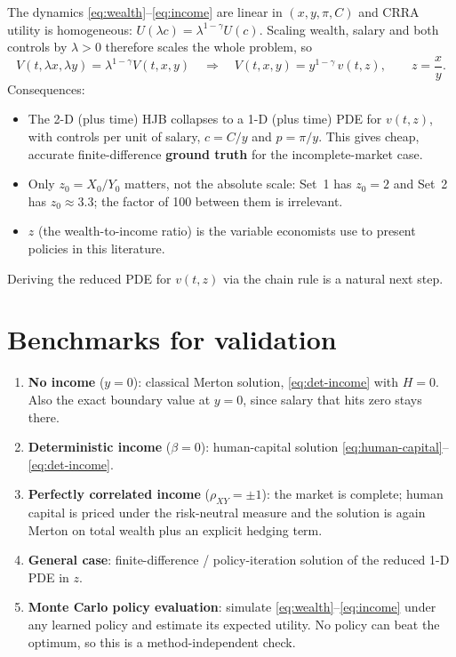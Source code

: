 \documentclass[11pt]{article}
\newcommand{\rxy}{\rho_{XY}}
\begin{document}
The dynamics \eqref{eq:wealth}--\eqref{eq:income} are linear in $(x,y,\pi,C)$ and
CRRA utility is homogeneous: $U(\lambda c)=\lambda^{1-\gamma}U(c)$. Scaling wealth,
salary and both controls by $\lambda>0$ therefore scales the whole problem, so
\[
V(t,\lambda x,\lambda y) = \lambda^{1-\gamma}V(t,x,y)
\quad\Longrightarrow\quad
\boxed{V(t,x,y) = y^{1-\gamma}\,v(t,z),\qquad z = \frac{x}{y}.}
\]
Consequences:
\begin{itemize}
  \item The 2-D (plus time) HJB collapses to a 1-D (plus time) PDE for $v(t,z)$, with
        controls per unit of salary, $c=C/y$ and $p=\pi/y$. This gives cheap,
        accurate finite-difference \textbf{ground truth} for the incomplete-market case.
  \item Only $z_0=X_0/Y_0$ matters, not the absolute scale: Set~1 has $z_0=2$ and
        Set~2 has $z_0\approx3.3$; the factor of 100 between them is irrelevant.
  \item $z$ (the wealth-to-income ratio) is the variable economists use to present
        policies in this literature.
\end{itemize}
Deriving the reduced PDE for $v(t,z)$ via the chain rule is a natural next step.

\section{Benchmarks for validation}
\begin{enumerate}
  \item \textbf{No income} ($y=0$): classical Merton solution, \eqref{eq:det-income}
        with $H=0$. Also the exact boundary value at $y=0$, since salary that hits
        zero stays there.
  \item \textbf{Deterministic income} ($\beta=0$): human-capital solution
        \eqref{eq:human-capital}--\eqref{eq:det-income}.
  \item \textbf{Perfectly correlated income} ($\rxy=\pm1$): the market is complete;
        human capital is priced under the risk-neutral measure and the solution is
        again Merton on total wealth plus an explicit hedging term.
  \item \textbf{General case}: finite-difference / policy-iteration solution of the
        reduced 1-D PDE in $z$.
  \item \textbf{Monte Carlo policy evaluation}: simulate
        \eqref{eq:wealth}--\eqref{eq:income} under any learned policy and estimate
        its expected utility. No policy can beat the optimum, so this is a
        method-independent check.
\end{enumerate}
\end{document}
